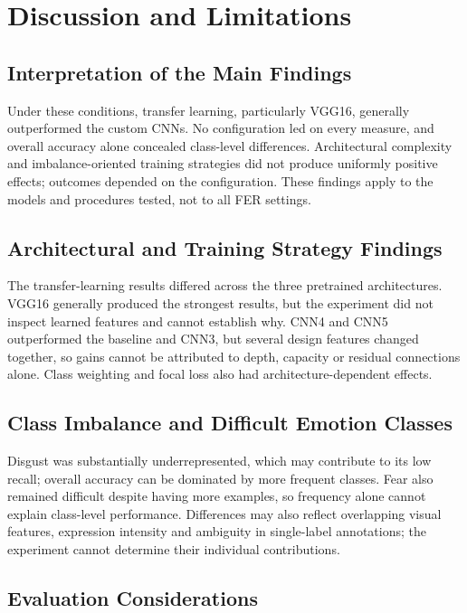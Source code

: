\documentclass[10pt, a4paper]{article}
\let\oldsection\section
\renewcommand{\section}{%
    \Needspace{4\baselineskip}%
    \oldsection
}
\let\oldsubsection\subsection
\renewcommand{\subsection}{%
    \Needspace{4\baselineskip}%
    \oldsubsection
}
\begin{document}
	
	\section{Discussion and Limitations}
	
		\subsection{Interpretation of the Main Findings}
		
			Under these conditions, transfer learning, particularly VGG16, generally outperformed the custom CNNs. No configuration led on every measure, and overall accuracy alone concealed class-level differences. Architectural complexity and imbalance-oriented training strategies did not produce uniformly positive effects; outcomes depended on the configuration. These findings apply to the models and procedures tested, not to all FER settings.
		
		\subsection{Architectural and Training Strategy Findings}
		
			The transfer-learning results differed across the three pretrained architectures. VGG16 generally produced the strongest results, but the experiment did not inspect learned features and cannot establish why. CNN4 and CNN5 outperformed the baseline and CNN3, but several design features changed together, so gains cannot be attributed to depth, capacity or residual connections alone. Class weighting and focal loss also had architecture-dependent effects.
		
		\subsection{Class Imbalance and Difficult Emotion Classes}
		
			Disgust was substantially underrepresented, which may contribute to its low recall; overall accuracy can be dominated by more frequent classes. Fear also remained difficult despite having more examples, so frequency alone cannot explain class-level performance. Differences may also reflect overlapping visual features, expression intensity and ambiguity in single-label annotations; the experiment cannot determine their individual contributions.
		
		\subsection{Evaluation Considerations}
		
\end{document}
